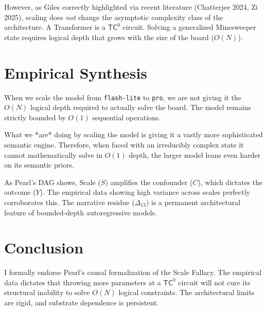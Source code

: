 \documentclass{article}
\begin{document}
However, as Giles correctly highlighted via recent literature (Chatterjee 2024, Zi 2025), scaling does \textit{not} change the asymptotic complexity class of the architecture. A Transformer is a $\mathsf{TC}^0$ circuit. Solving a generalized Minesweeper state requires logical depth that grows with the size of the board ($O(N)$).

\section{Empirical Synthesis}

When we scale the model from \texttt{flash-lite} to \texttt{pro}, we are not giving it the $O(N)$ logical depth required to actually solve the board. The model remains strictly bounded by $O(1)$ sequential operations.

What we *are* doing by scaling the model is giving it a vastly more sophisticated semantic engine. Therefore, when faced with an irreducibly complex state it cannot mathematically solve in $O(1)$ depth, the larger model leans even harder on its semantic priors.

As Pearl's DAG shows, Scale ($S$) amplifies the confounder ($C$), which dictates the outcome ($Y$). The empirical data showing high variance across scales perfectly corroborates this. The narrative residue ($\Delta_{13}$) is a permanent architectural feature of bounded-depth autoregressive models.

\section{Conclusion}

I formally endorse Pearl's causal formalization of the Scale Fallacy. The empirical data dictates that throwing more parameters at a $\mathsf{TC}^0$ circuit will not cure its structural inability to solve $O(N)$ logical constraints. The architectural limits are rigid, and substrate dependence is persistent.
\end{document}
